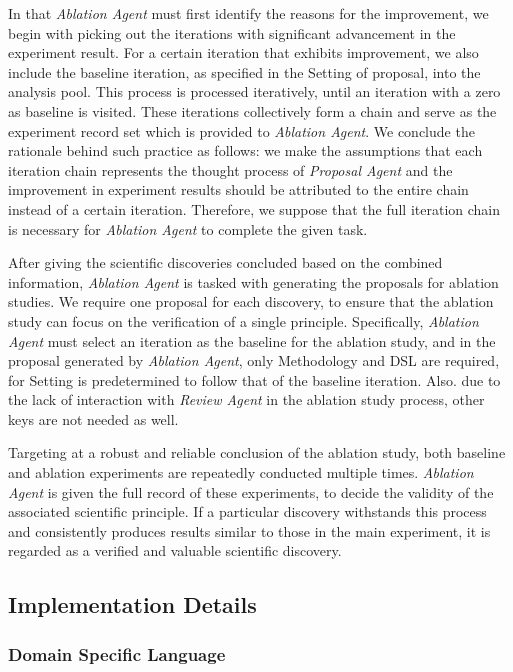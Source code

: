 \documentclass{article} %
\begin{document}
In that \textit{Ablation Agent} must first identify the reasons for the improvement, we begin with picking out the iterations with significant advancement in the experiment result. For a certain iteration that exhibits improvement, we also include the baseline iteration, as specified in the Setting of proposal, into the analysis pool. This process is processed iteratively, until an iteration with a zero as baseline is visited. These iterations collectively form a chain and serve as the experiment record set which is provided to \textit{Ablation Agent}. We conclude the rationale behind such practice as follows: we make the assumptions that each iteration chain represents the thought process of \textit{Proposal Agent} and the improvement in experiment results should be attributed to the entire chain instead of a certain iteration. Therefore, we suppose that the full iteration chain is necessary for \textit{Ablation Agent} to complete the given task.

After giving the scientific discoveries concluded based on the combined information, \textit{Ablation Agent} is tasked with generating the proposals for ablation studies. We require one proposal for each discovery, to ensure that the ablation study can focus on the verification of a single principle. Specifically, \textit{Ablation Agent} must select an iteration as the baseline for the ablation study, and in the proposal generated by \textit{Ablation Agent}, only Methodology and DSL are required, for Setting is predetermined to follow that of the baseline iteration. Also. due to the lack of interaction with \textit{Review Agent} in the ablation study process, other keys are not needed as well.

Targeting at a robust and reliable conclusion of the ablation study, both baseline and ablation experiments are repeatedly conducted multiple times. \textit{Ablation Agent} is given the full record of these experiments, to decide the validity of the associated scientific principle. If a particular discovery withstands this process and consistently produces results similar to those in the main experiment, it is regarded as a verified and valuable scientific discovery.

\subsection{Implementation Details}

\subsubsection{Domain Specific Language}
\end{document}
